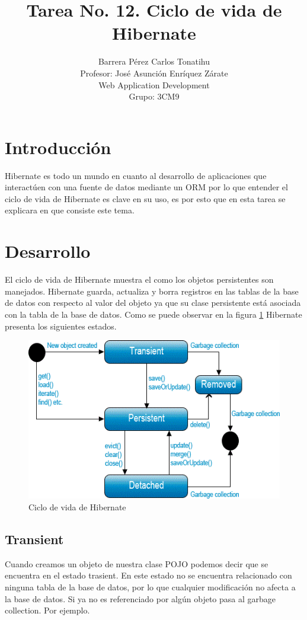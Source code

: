 \documentclass[a4paper,12pt]{article}
\title{Tarea No. 12. Ciclo de vida de Hibernate}
\author{Barrera Pérez Carlos Tonatihu \\ Profesor: José Asunción Enríquez 
Zárate \\ Web Application Development \\ Grupo: 3CM9 }
\begin{document}
\maketitle
\newpage
\tableofcontents
\newpage

\section{Introducción}
Hibernate es todo un mundo en cuanto al desarrollo de aplicaciones que 
interactúen con una fuente de datos mediante un ORM por lo que entender el 
ciclo de vida de Hibernate es clave en su uso, es por esto que en esta tarea se 
explicara en que consiste este tema.
\section{Desarrollo}
El ciclo de vida de Hibernate muestra el como los objetos persistentes son 
manejados. Hibernate guarda, actualiza y borra registros en las tablas de la 
base de datos con respecto al valor del objeto ya que su clase persistente está 
asociada con la tabla de la base de datos. Como se puede observar en 
la figura \ref{fig:diagrama} Hibernate presenta los siguientes estados.


\begin{figure}[H]
    \begin{center}
    \includegraphics[width=\textwidth]{diagrama.png}
    \caption{Ciclo de vida de Hibernate}
    \label{fig:diagrama}
    \end{center}
\end{figure}

\subsection{Transient}
Cuando creamos un objeto de nuestra clase POJO podemos decir que se encuentra 
en el estado trasient. En este estado no se encuentra relacionado con ninguna 
tabla de la base de datos, por lo que cualquier modificación no afecta a la 
base de datos. Si ya no es referenciado por algún objeto pasa al garbage 
collection. Por ejemplo.
\end{document}
